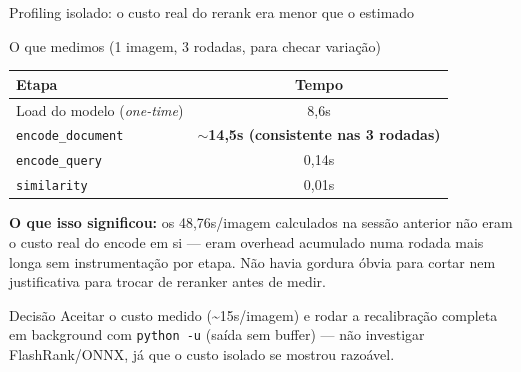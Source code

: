 \documentclass{beamer}
\newenvironment{numerobloco}[1]{\begin{block}{#1}}{\end{block}}
\newenvironment{decisaobloco}[1]{\begin{alertblock}{#1}}{\end{alertblock}}
\begin{document}
\begin{frame}{Profiling isolado: o custo real do rerank era menor que o estimado}
  \small
  \begin{numerobloco}{O que medimos (1 imagem, 3 rodadas, para checar variação)}
    \begin{center}
    \footnotesize
    \begin{tabular}{lc}
      \toprule
      \textbf{Etapa} & \textbf{Tempo} \\
      \midrule
      Load do modelo (\emph{one-time}) & 8,6s \\
      \texttt{encode\_document} & \textbf{$\sim$14,5s (consistente nas 3 rodadas)} \\
      \texttt{encode\_query} & 0,14s \\
      \texttt{similarity} & 0,01s \\
      \bottomrule
    \end{tabular}
    \end{center}
  \end{numerobloco}

  \pause
  \textbf{O que isso significou:} os 48,76s/imagem calculados na sessão anterior não
  eram o custo real do encode em si — eram overhead acumulado numa rodada mais longa
  sem instrumentação por etapa. Não havia gordura óbvia para cortar nem justificativa
  para trocar de reranker antes de medir.

  \pause
  \begin{decisaobloco}{Decisão}
    Aceitar o custo medido (\textasciitilde15s/imagem) e rodar a recalibração completa
    em background com \texttt{python -u} (saída sem buffer) — não investigar
    FlashRank/ONNX, já que o custo isolado se mostrou razoável.
  \end{decisaobloco}
\end{frame}
\end{document}
